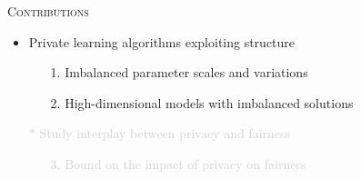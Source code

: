 \documentclass[17pt,aspectratio=169]{beamer}
\begin{document}
\begin{frame}{\textsc{Contributions}}

  \begin{itemize}
    \large
  \item Private learning algorithms exploiting structure
    \begin{enumerate}
      \normalsize
    \item[1.] Imbalanced parameter scales and variations
    \item[2.] High-dimensional models with imbalanced solutions
    \end{enumerate}
    \vspace{1em}
  \item[\textcolor{lightgray}{$\ast$}] \textcolor{lightgray}{Study interplay between privacy and fairness}
    \large
    \begin{enumerate}
      \normalsize
    \item[\textcolor{lightgray}{3.}] \textcolor{lightgray}{Bound on the impact of privacy on fairness}
    \end{enumerate}
  \end{itemize}
\end{frame}
\end{document}
